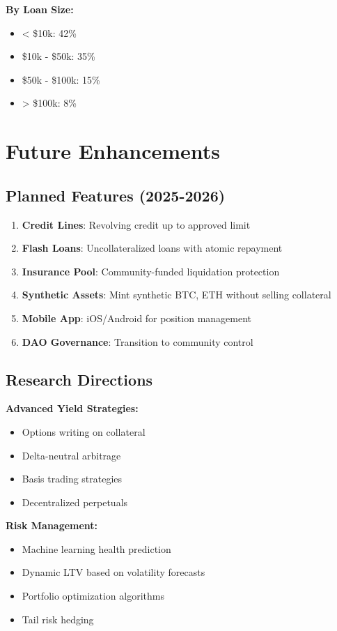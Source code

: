 \documentclass[11pt,a4paper]{article}
\begin{document}
\textbf{By Loan Size:}
\begin{itemize}
\item < \$10k: 42\%
\item \$10k - \$50k: 35\%
\item \$50k - \$100k: 15\%
\item > \$100k: 8\%
\end{itemize}

\section{Future Enhancements}

\subsection{Planned Features (2025-2026)}

\begin{enumerate}
\item \textbf{Credit Lines}: Revolving credit up to approved limit
\item \textbf{Flash Loans}: Uncollateralized loans with atomic repayment
\item \textbf{Insurance Pool}: Community-funded liquidation protection
\item \textbf{Synthetic Assets}: Mint synthetic BTC, ETH without selling collateral
\item \textbf{Mobile App}: iOS/Android for position management
\item \textbf{DAO Governance}: Transition to community control
\end{enumerate}

\subsection{Research Directions}

\textbf{Advanced Yield Strategies:}
\begin{itemize}
\item Options writing on collateral
\item Delta-neutral arbitrage
\item Basis trading strategies
\item Decentralized perpetuals
\end{itemize}

\textbf{Risk Management:}
\begin{itemize}
\item Machine learning health prediction
\item Dynamic LTV based on volatility forecasts
\item Portfolio optimization algorithms
\item Tail risk hedging
\end{itemize}
\end{document}

